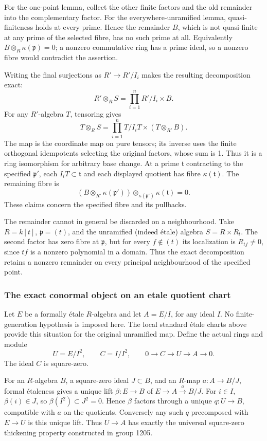 For the one-point lemma, collect the other finite factors and the old remainder into the complementary factor. For the everywhere-unramified lemma, quasi-finiteness holds at every prime. Hence the remainder \(B\), which is not quasi-finite at any prime of the selected fibre, has no such prime at all. Equivalently \(B\otimes_R\kappa(\mathfrak p)=0\); a nonzero commutative ring has a prime ideal, so a nonzero fibre would contradict the assertion.

Writing the final surjections as \(R'\to R'/I_i\) makes the resulting decomposition exact: \[
R'\otimes_RS=\prod_{i=1}^n R'/I_i\times B.
\] For any \(R'\)-algebra \(T\), tensoring gives \[
T\otimes_RS=\prod_{i=1}^n T/I_iT\times(T\otimes_{R'}B).
\] The map is the coordinate map on pure tensors; its inverse uses the finite orthogonal idempotents selecting the original factors, whose sum is 1. Thus it is a ring isomorphism for arbitrary base change. At a prime \(\mathfrak t\) contracting to the specified \(\mathfrak p'\), each \(I_iT\subset\mathfrak t\) and each displayed quotient has fibre \(\kappa(\mathfrak t)\). The remaining fibre is \[
(B\otimes_{R'}\kappa(\mathfrak p'))
   \otimes_{\kappa(\mathfrak p')}\kappa(\mathfrak t)=0.
\] These claims concern the specified fibre and its pullbacks.

The remainder cannot in general be discarded on a neighbourhood. Take \(R=k[t]\), \(\mathfrak p=(t)\), and the unramified (indeed étale) algebra \(S=R\times R_t\). The second factor has zero fibre at \(\mathfrak p\), but for every \(f\notin(t)\) its localization is \(R_{tf}\ne0\), since \(tf\) is a nonzero polynomial in a domain. Thus the exact decomposition retains a nonzero remainder on every principal neighbourhood of the specified point.

\subsubsection{The exact conormal object on an etale quotient chart}\label{the-exact-conormal-object-on-an-etale-quotient-chart}

Let \(E\) be a formally étale \(R\)-algebra and let \(A=E/I\), for any ideal \(I\). No finite-generation hypothesis is imposed here. The local standard étale charts above provide this situation for the original unramified map. Define the actual rings and module \[
U=E/I^2,\qquad C=I/I^2,\qquad
0\longrightarrow C\longrightarrow U\longrightarrow A
\longrightarrow0.
\] The ideal \(C\) is square-zero.

For an \(R\)-algebra \(B\), a square-zero ideal \(J\subset B\), and an \(R\)-map \(a:A\to B/J\), formal étaleness gives a unique lift \(\beta:E\to B\) of \(E\to A\xrightarrow a B/J\). For \(i\in I\), \(\beta(i)\in J\), so \(\beta(I^2)\subset J^2=0\). Hence \(\beta\) factors through a unique \(q:U\to B\), compatible with \(a\) on the quotients. Conversely any such \(q\) precomposed with \(E\to U\) is this unique lift. Thus \(U\to A\) has exactly the universal square-zero thickening property constructed in group 1205.

